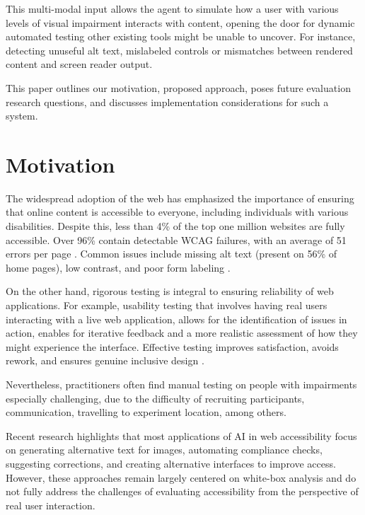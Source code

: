 This multi-modal input allows the agent to simulate how a user with various levels of visual impairment interacts with content, opening the door for dynamic automated testing other existing tools might be unable to uncover. For instance, detecting unuseful alt text, mislabeled controls or mismatches between rendered content and screen reader output. 

This paper outlines our motivation, proposed approach, poses future evaluation research questions, and discusses implementation considerations for such a system.
\vspace{-4pt}

\section{Motivation}

The widespread adoption of the web has emphasized the importance of ensuring that online content is accessible to everyone, including individuals with various disabilities\cite{abu2023web}. Despite this, less than 4\% of the top one million websites are fully accessible. Over 96\% contain detectable \ac{WCAG} failures, with an average of 51 errors per page \cite{webaimmillion2025}. Common issues include missing alt text (present on 56\% of home pages), low contrast, and poor form labeling \cite{audioeye2024}.

On the other hand, rigorous testing is integral to ensuring reliability of web applications. For example, usability testing that involves having real users interacting with a live web application, allows for the identification of issues in action, enables for iterative feedback and a more realistic assessment of how they might experience the interface. Effective testing improves satisfaction, avoids rework, and ensures genuine inclusive design \cite{accessdesign2025}. 

Nevertheless, practitioners often find manual testing on people with impairments especially challenging, due to the difficulty of recruiting participants, communication, travelling to experiment location, among others\cite{xu2025conducting}.

Recent research highlights that most applications of \ac{AI} in web accessibility focus on generating alternative text for images, automating compliance checks, suggesting corrections, and creating alternative interfaces to improve access\cite{vera2025towards}. However, these approaches remain largely centered on white-box analysis and do not fully address the challenges of evaluating accessibility from the perspective of real user interaction. 

